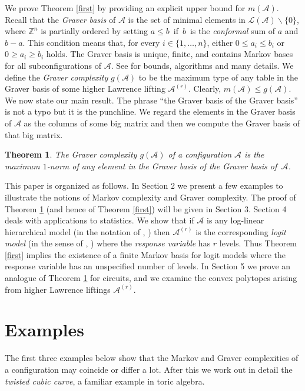 \documentclass[11pt]{amsart}
\newtheorem{theorem}{Theorem}
\theoremstyle{definition}
\newcommand{\integers}{{\mathbb Z}}
\renewcommand{\L}{{\mathcal L}}
\newcommand{\A}{{\mathcal A}}
\begin{document}
We prove Theorem \ref{first} by providing
an explicit upper bound for $m(\A)$.
Recall that the  \emph{Graver basis} of
$\A$ is the set of minimal
elements in $\L(\A) \backslash \{0\}$,
where $\integers^n$ is partially ordered by
setting $a \leq b\,$ if  $\,b \,$ is the
\emph{conformal} sum of $a$ and $b-a$.
This condition means that,
for every $i \in \{1,\ldots,n\}$, either
$ 0 \leq a_i \leq b_i $ or $ 0 \geq a_i \geq b_i$ holds.
The Graver basis is unique, finite, and contains
Markov bases for all subconfigurations of $\A$.
See \cite{Sturmfels-book} for bounds, algorithms and many details.
We define the {\em Graver complexity} $g(\A)$ to be the maximum type
of any table in the Graver basis of some
higher Lawrence lifting $\A^{(r)}$. Clearly, $m(\A) \leq g(\A)$.
We now state our main result. The phrase
``the Graver basis of the Graver basis''
is not a typo but it is the punchline.
We regard the elements in the
 Graver basis of $\A$ as the columns
of some big matrix and then we
compute the Graver basis of that big matrix.


  \begin{theorem}
  \label{main}
The Graver complexity $g(\A)$ of a configuration $\A$
is the maximum $1$-norm
of any element in the Graver basis of the Graver basis of~$\A$.
  \end{theorem}

This paper is organized as follows.
In Section 2 we present a few examples
to illustrate the notions of Markov complexity
and Graver complexity. The proof of Theorem \ref{main}
(and hence of Theorem \ref{first}) will be given in Section 3.
Section 4 deals
with applications to statistics. We show that
if $\A$ is any log-linear hierarchical model
(in the notation of \cite{GMS}, \cite{HS})
then $\A^{(r)}$ is the corresponding
{\em logit model} (in the sense of \cite[\S VII]{Chr}, \cite[\S 6]{Fie})
where the {\em response variable}
has $r$ levels. Thus Theorem \ref{first} implies
the existence of a finite Markov basis for
logit models where the response variable
has an unspecified number of levels.
   In Section 5 we prove an analogue of
Theorem \ref{main} for circuits,
and we examine the convex polytopes arising from
higher Lawrence liftings $\A^{(r)}$.




\section{\bf Examples}
\label{sec:examples}

The first three examples below show that the Markov and Graver  
complexities of a
configuration may coincide or differ a lot. After this we work out in
detail the {\em twisted cubic curve}, a familiar
example in toric algebra.
\end{document}
